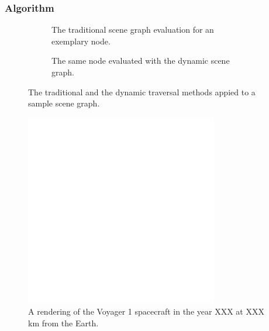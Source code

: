 \subsubsection{Algorithm} \label{contributions:astro:dsg:algorithm}
\begin{figure}
\centering
\begin{subfigure}[b]{0.4\textwidth}
    \caption{The traditional scene graph evaluation for an exemplary node.}
    \label{contributions:astro:dsg:sceengraph:traditional}
\end{subfigure}
\hspace*{1cm}
\begin{subfigure}[b]{0.4\textwidth}
    \caption{The same node evaluated with the dynamic scene graph.}
    \label{contributions:astro:dsg:sceengraph:dsg}
\end{subfigure}
\caption{The traditional and the dynamic traversal methods appied to a sample scene graph.}
\label{contributions:astro:dsg:sceengraph}
\end{figure}

\begin{figure}
\centering
\includegraphics[width=0.75\textwidth]{figures/empty.png}
\caption{A rendering of the Voyager 1 spacecraft in the year XXX at XXX\, km from the Earth.}
\label{contributions:astro:dsg:voyager}
\end{figure}

